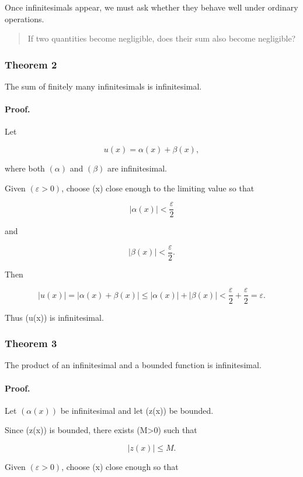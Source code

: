 Once infinitesimals appear, we must ask whether they behave well under ordinary operations.

\begin{quote}
If two quantities become negligible, does their sum also become negligible?
\end{quote}

\subsubsection*{Theorem 2}

The sum of finitely many infinitesimals is infinitesimal.

\paragraph{Proof.}

Let

\[
u(x)=\alpha(x)+\beta(x),
\]

where both $(\alpha)$ and $(\beta)$ are infinitesimal.

Given $(\varepsilon>0)$, choose (x) close enough to the limiting value so that

\[
|\alpha(x)|<\frac{\varepsilon}{2}
\]

and

\[
|\beta(x)|<\frac{\varepsilon}{2}.
\]

Then

\[
|u(x)| =|\alpha(x)+\beta(x)| \leq |\alpha(x)|+|\beta(x)| < \frac{\varepsilon}{2}+\frac{\varepsilon}{2} = \varepsilon.
\]

Thus (u(x)) is infinitesimal.

\subsubsection*{Theorem 3}

The product of an infinitesimal and a bounded function is infinitesimal.

\paragraph{Proof.}

Let $(\alpha(x))$ be infinitesimal and let (z(x)) be bounded.

Since (z(x)) is bounded, there exists (M>0) such that

\[
|z(x)|\leq M.
\]

Given $(\varepsilon>0)$, choose (x) close enough so that

